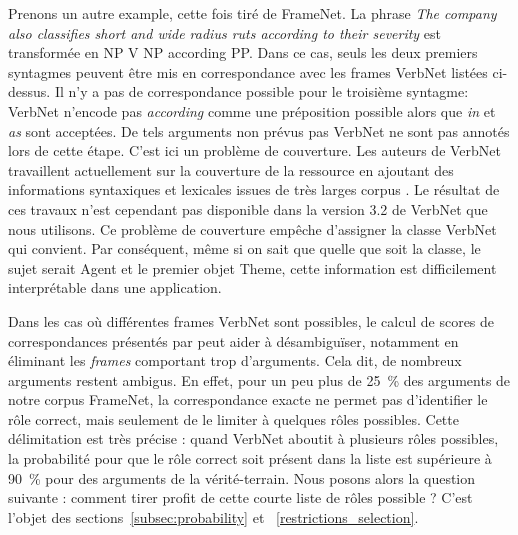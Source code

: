 Prenons un autre example, cette fois tiré de FrameNet. La phrase \textit{The
company also classifies short and wide radius ruts according to their severity}
est transformée en NP V NP according PP. Dans ce cas, seuls les deux premiers
syntagmes peuvent être mis en correspondance avec les frames VerbNet listées
ci-dessus. Il n'y a pas de correspondance possible pour le troisième syntagme:
VerbNet n'encode pas \textit{according} comme une préposition possible alors que
\textit{in} et \textit{as} sont acceptées. De tels arguments non prévus pas VerbNet
ne sont pas annotés lors de cette étape. C'est ici un problème de couverture.
Les auteurs de VerbNet travaillent actuellement sur la couverture de la
ressource en ajoutant des informations syntaxiques et lexicales issues de très
larges corpus \citep{bonial2013expanding}. Le résultat de ces travaux n'est
cependant pas disponible dans la version 3.2 de VerbNet que nous utilisons. Ce
problème de couverture empêche d'assigner la classe VerbNet qui convient. Par
conséquent, même si on sait que quelle que soit la classe, le sujet serait
Agent et le premier objet Theme, cette information est difficilement
interprétable dans une application.

Dans les cas où différentes frames VerbNet sont possibles, le calcul de scores
de correspondances présentés par \cite{swier2004unsupervised} peut aider à
désambiguïser, notamment en éliminant les \textit{frames} comportant trop
d'arguments. Cela dit, de nombreux arguments restent ambigus.  En effet, pour
un peu plus de 25~\% des arguments de notre corpus FrameNet, la correspondance
exacte ne permet pas d'identifier le rôle correct, mais seulement de le limiter
à quelques rôles possibles. Cette délimitation est très précise : quand VerbNet
aboutit à plusieurs rôles possibles, la probabilité pour que le rôle correct
soit présent dans la liste est supérieure à 90~\% pour des arguments de la
vérité-terrain. Nous posons alors la question suivante : comment tirer profit
de cette courte liste de rôles possible ? C'est l'objet des
sections~\ref{subsec:probability} et ~\ref{restrictions_selection}.





